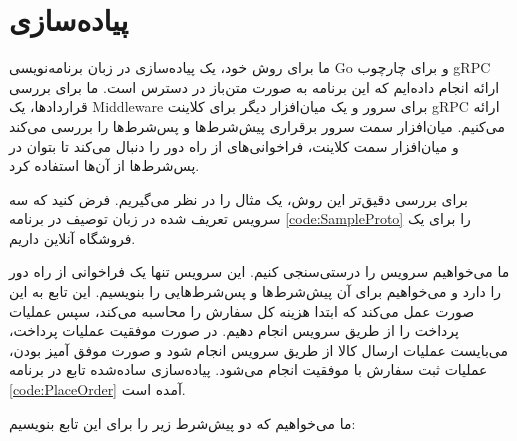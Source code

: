 \section{پیاده‌سازی}

ما برای روش خود، یک پیاده‌سازی در زبان برنامه‌نویسی
Go
و برای چارچوب
gRPC
ارائه انجام داده‌ایم که این برنامه به صورت متن‌باز
\cite{grpcGoContracts}
در دسترس است. ما برای بررسی قراردادها، یک
\gls{Middleware}
برای سرور و یک میان‌افزار دیگر برای کلاینت gRPC ارائه می‌کنیم. میان‌افزار سمت سرور برقراری پیش‌شرط‌ها و پس‌شرط‌ها را بررسی می‌کند و میان‌افزار سمت کلاینت، فراخوانی‌های از راه‌ دور را دنبال می‌کند تا بتوان در پس‌شرط‌ها از آن‌ها استفاده کرد.

برای بررسی دقیق‌تر این روش، یک مثال را در نظر می‌گیریم. فرض کنید که سه سرویس تعریف شده در زبان توصیف 
در برنامه 
\ref{code:SampleProto}
را برای یک فروشگاه آنلاین داریم.

\singlespacing
\begin{figure}
	\begin{LTR}
		
	\end{LTR}
\end{figure}
\doublespacing

ما می‌خواهیم سرویس 
را درستی‌سنجی کنیم. این سرویس تنها یک فراخوانی از راه‌ دور
را دارد و می‌خواهیم برای آن پیش‌شرط‌ها و پس‌شرط‌هایی را بنویسیم. این تابع به این صورت عمل می‌کند که ابتدا هزینه کل سفارش را محاسبه می‌کند، سپس عملیات پرداخت را از طریق سرویس
انجام دهیم. در صورت موفقیت عملیات پرداخت، می‌بایست عملیات ارسال کالا از طریق سرویس
انجام شود و صورت موفق آمیز بودن، عملیات ثبت سفارش با موفقیت انجام می‌شود. پیاده‌سازی ساده‌شده تابع
در برنامه
\ref{code:PlaceOrder}
آمده است.

\singlespacing
\begin{figure}
	\begin{LTR}
		
	\end{LTR}
\end{figure}
\doublespacing


ما می‌خواهیم که دو پیش‌شرط زیر را برای این تابع بنویسیم:

